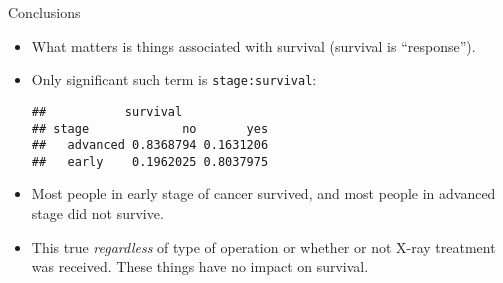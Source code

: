 \begin{frame}[fragile]{Conclusions}
  
  \begin{itemize}
  \item What matters is things associated with survival (survival is
    ``response'').
  \item Only significant such term is \texttt{stage:survival}:
\begin{knitrout}
\color{fgcolor}\begin{kframe}
\begin{alltt}
\hlkwb{=}\hlopt{~}\hlopt{+}
\hlstd{=}\hlstd{)}
\end{alltt}
\begin{verbatim}
##           survival
## stage             no       yes
##   advanced 0.8368794 0.1631206
##   early    0.1962025 0.8037975
\end{verbatim}
\end{kframe}
\end{knitrout}
\item Most people in early stage of cancer survived, and most people
  in advanced stage did not survive.
\item This true \emph{regardless} of type of operation or whether or
  not X-ray treatment was received. These things have no impact on
  survival. 
  \end{itemize}
  
\end{frame}

